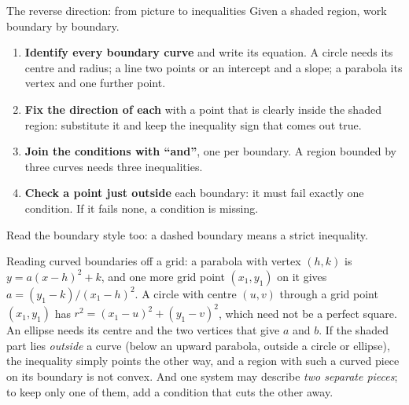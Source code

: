 \begin{rulebox}{The reverse direction: from picture to inequalities}
Given a shaded region, work boundary by boundary.
\begin{enumerate}[leftmargin=1.8em,itemsep=0.3ex]
  \item \textbf{Identify every boundary curve} and write its equation. A
        circle needs its centre and radius; a line two points or an
        intercept and a slope; a parabola its vertex and one further
        point.
  \item \textbf{Fix the direction of each} with a point that is clearly
        inside the shaded region: substitute it and keep the inequality
        sign that comes out true.
  \item \textbf{Join the conditions with ``and''}, one per boundary. A region
        bounded by three curves needs three inequalities.
  \item \textbf{Check a point just outside} each boundary: it must fail
        exactly one condition. If it fails none, a condition is missing.
\end{enumerate}
Read the boundary style too: a dashed boundary means a strict inequality.

Reading curved boundaries off a grid: a parabola with vertex $(h,k)$ is
$y=a(x-h)^{2}+k$, and one more grid point $(x_{1},y_{1})$ on it gives
$a=(y_{1}-k)/(x_{1}-h)^{2}$. A circle with centre $(u,v)$ through a grid
point $(x_{1},y_{1})$ has $r^{2}=(x_{1}-u)^{2}+(y_{1}-v)^{2}$, which need
not be a perfect square. An ellipse needs its centre and the two vertices
that give $a$ and $b$. If the shaded part lies \emph{outside} a curve (below
an upward parabola, outside a circle or ellipse), the inequality simply
points the other way, and a region with such a curved piece on its
boundary is not convex. And one system may
describe \emph{two separate pieces}; to keep only one of them, add a
condition that cuts the other away.
\end{rulebox}

